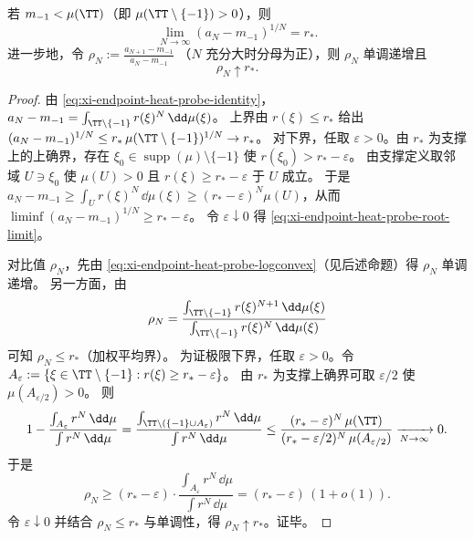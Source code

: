 \begin{theorem}[指数根与比值极限决定谱隙半径]\label{thm:xi-endpoint-heat-probe-rstar-root-ratio}
若 \(m_{-1}<\mu(\TT)\)（即 \(\mu(\TT\setminus\{-1\})>0\)），则
\begin{equation}\label{eq:xi-endpoint-heat-probe-root-limit}
\boxed{\;\lim_{N\to\infty}(a_N-m_{-1})^{1/N}=r_\ast.\;}
\end{equation}
进一步地，令
\(
\rho_N:=\frac{a_{N+1}-m_{-1}}{a_N-m_{-1}}
\)
（\(N\) 充分大时分母为正），则 \(\rho_N\) 单调递增且
\begin{equation}\label{eq:xi-endpoint-heat-probe-ratio-limit}
\boxed{\;\rho_N\uparrow r_\ast.\;}
\end{equation}
\end{theorem}
\begin{proof}
由 \eqref{eq:xi-endpoint-heat-probe-identity}，
\(
a_N-m_{-1}=\int_{\TT\setminus\{-1\}} r(\xi)^N\,\dd\mu(\xi)
\)。
上界由 \(r(\xi)\le r_\ast\) 给出
\(
(a_N-m_{-1})^{1/N}\le r_\ast\,\mu(\TT\setminus\{-1\})^{1/N}\to r_\ast
\)。
对下界，任取 \(\varepsilon>0\)。由 \(r_\ast\) 为支撑上的上确界，存在 \(\xi_0\in\operatorname{supp}(\mu)\setminus\{-1\}\) 使 \(r(\xi_0)>r_\ast-\varepsilon\)。
由支撑定义取邻域 \(U\ni\xi_0\) 使 \(\mu(U)>0\) 且 \(r(\xi)\ge r_\ast-\varepsilon\) 于 \(U\) 成立。
于是
\(
a_N-m_{-1}\ge \int_U r(\xi)^N\,\dd\mu(\xi)\ge (r_\ast-\varepsilon)^N\mu(U)
\)，从而 \(\liminf (a_N-m_{-1})^{1/N}\ge r_\ast-\varepsilon\)。
令 \(\varepsilon\downarrow 0\) 得 \eqref{eq:xi-endpoint-heat-probe-root-limit}。
\par
对比值 \(\rho_N\)，先由 \eqref{eq:xi-endpoint-heat-probe-logconvex}（见后述命题）得 \(\rho_N\) 单调递增。
另一方面，由
\[
\rho_N=\frac{\int_{\TT\setminus\{-1\}} r(\xi)^{N+1}\,\dd\mu(\xi)}{\int_{\TT\setminus\{-1\}} r(\xi)^{N}\,\dd\mu(\xi)}
\]
可知 \(\rho_N\le r_\ast\)（加权平均界）。
为证极限下界，任取 \(\varepsilon>0\)。令 \(A_{\varepsilon}:=\{\xi\in\TT\setminus\{-1\}: r(\xi)\ge r_\ast-\varepsilon\}\)。
由 \(r_\ast\) 为支撑上确界可取 \(\varepsilon/2\) 使 \(\mu(A_{\varepsilon/2})>0\)。
则
\[
1-\frac{\int_{A_{\varepsilon}} r^N\,\dd\mu}{\int r^N\,\dd\mu}
=\frac{\int_{\TT\setminus(\{-1\}\cup A_{\varepsilon})} r^N\,\dd\mu}{\int r^N\,\dd\mu}
\le
\frac{(r_\ast-\varepsilon)^N\,\mu(\TT)}{(r_\ast-\varepsilon/2)^N\,\mu(A_{\varepsilon/2})}\xrightarrow[N\to\infty]{}0.
\]
于是
\[
\rho_N\ge (r_\ast-\varepsilon)\cdot \frac{\int_{A_{\varepsilon}} r^N\,\dd\mu}{\int r^N\,\dd\mu}=(r_\ast-\varepsilon)\,(1+o(1)).
\]
令 \(\varepsilon\downarrow 0\) 并结合 \(\rho_N\le r_\ast\) 与单调性，得 \(\rho_N\uparrow r_\ast\)。证毕。
\end{proof}

